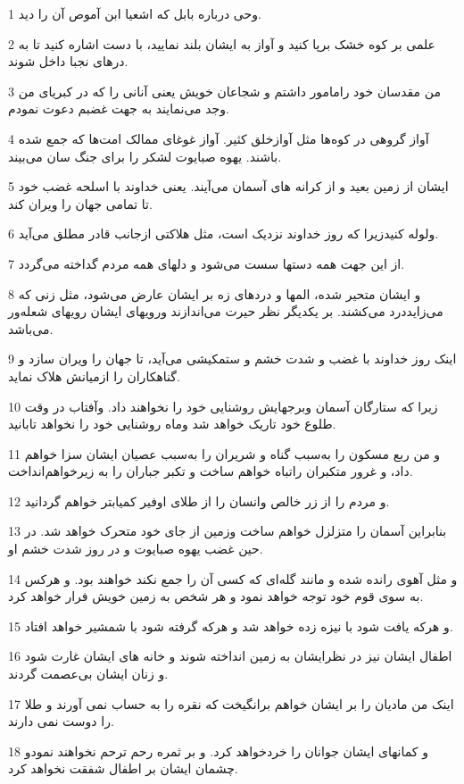 \par 1 وحی درباره بابل که اشعیا ابن آموص آن را دید.
\par 2 علمی بر کوه خشک برپا کنید و آواز به ایشان بلند نمایید، با دست اشاره کنید تا به درهای نجبا داخل شوند.
\par 3 من مقدسان خود رامامور داشتم و شجاعان خویش یعنی آنانی را که در کبریای من وجد می‌نمایند به جهت غضبم دعوت نمودم.
\par 4 آواز گروهی در کوه‌ها مثل آوازخلق کثیر. آواز غوغای ممالک امت‌ها که جمع شده باشند. یهوه صبایوت لشکر را برای جنگ سان می‌بیند.
\par 5 ایشان از زمین بعید و از کرانه های آسمان می‌آیند. یعنی خداوند با اسلحه غضب خود تا تمامی جهان را ویران کند.
\par 6 ولوله کنیدزیرا که روز خداوند نزدیک است، مثل هلاکتی ازجانب قادر مطلق می‌آید.
\par 7 از این جهت همه دستها سست می‌شود و دلهای همه مردم گداخته می‌گردد.
\par 8 و ایشان متحیر شده، المها و دردهای زه بر ایشان عارض می‌شود، مثل زنی که می‌زایددرد می‌کشند. بر یکدیگر نظر حیرت می‌اندازند ورویهای ایشان رویهای شعله‌ور می‌باشد.
\par 9 اینک روز خداوند با غضب و شدت خشم و ستمکیشی می‌آید، تا جهان را ویران سازد و گناهکاران را ازمیانش هلاک نماید.
\par 10 زیرا که ستارگان آسمان وبرجهایش روشنایی خود را نخواهند داد. وآفتاب در وقت طلوع خود تاریک خواهد شد وماه روشنایی خود را نخواهد تابانید.
\par 11 و من ربع مسکون را به‌سبب گناه و شریران را به‌سبب عصیان ایشان سزا خواهم داد، و غرور متکبران راتباه خواهم ساخت و تکبر جباران را به زیرخواهم‌انداخت.
\par 12 و مردم را از زر خالص وانسان را از طلای اوفیر کمیابتر خواهم گردانید.
\par 13 بنابراین آسمان را متزلزل خواهم ساخت وزمین از جای خود متحرک خواهد شد. در حین غضب یهوه صبایوت و در روز شدت خشم او.
\par 14 و مثل آهوی رانده شده و مانند گله‌ای که کسی آن را جمع نکند خواهند بود. و هرکس به سوی قوم خود توجه خواهد نمود و هر شخص به زمین خویش فرار خواهد کرد.
\par 15 و هرکه یافت شود با نیزه زده خواهد شد و هرکه گرفته شود با شمشیر خواهد افتاد.
\par 16 اطفال ایشان نیز در نظرایشان به زمین انداخته شوند و خانه های ایشان غارت شود و زنان ایشان بی‌عصمت گردند.
\par 17 اینک من مادیان را بر ایشان خواهم برانگیخت که نقره را به حساب نمی آورند و طلا را دوست نمی دارند.
\par 18 و کمانهای ایشان جوانان را خردخواهد کرد. و بر ثمره رحم ترحم نخواهند نمودو چشمان ایشان بر اطفال شفقت نخواهد کرد.
